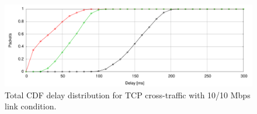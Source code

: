  \begin{figure}[h]
  \centering
    \includegraphics[width=1\textwidth]{./figures/iperf_std_total_delay_distribution.pdf}
      \caption[Total CDF delay distribution for TCP cross-traffic with 10/10 Mbps link condition]{Total CDF delay distribution for TCP cross-traffic with 10/10 Mbps link condition.}
	\label{fig:iperfTestStdDelay}
\end{figure}



